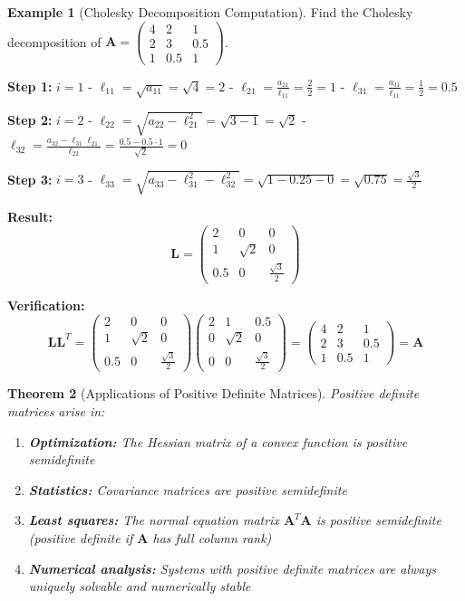 \documentclass[12pt]{article}
\numberwithin{equation}{section}
\newcommand{\mat}[1]{\mathbf{#1}}        %
\theoremstyle{plain}
\newtheorem{theorem}{Theorem}[section]
\theoremstyle{definition}
\newtheorem{example}[theorem]{Example}
\theoremstyle{remark}
\begin{document}
\begin{example}[Cholesky Decomposition Computation]
Find the Cholesky decomposition of $\mat{A} = \begin{pmatrix} 4 & 2 & 1 \\ 2 & 3 & 0.5 \\ 1 & 0.5 & 1 \end{pmatrix}$.

\textbf{Step 1:} $i = 1$
- $\ell_{11} = \sqrt{a_{11}} = \sqrt{4} = 2$
- $\ell_{21} = \frac{a_{21}}{\ell_{11}} = \frac{2}{2} = 1$
- $\ell_{31} = \frac{a_{31}}{\ell_{11}} = \frac{1}{2} = 0.5$

\textbf{Step 2:} $i = 2$
- $\ell_{22} = \sqrt{a_{22} - \ell_{21}^2} = \sqrt{3 - 1} = \sqrt{2}$
- $\ell_{32} = \frac{a_{32} - \ell_{31}\ell_{21}}{\ell_{22}} = \frac{0.5 - 0.5 \cdot 1}{\sqrt{2}} = 0$

\textbf{Step 3:} $i = 3$
- $\ell_{33} = \sqrt{a_{33} - \ell_{31}^2 - \ell_{32}^2} = \sqrt{1 - 0.25 - 0} = \sqrt{0.75} = \frac{\sqrt{3}}{2}$

\textbf{Result:}
$$\mat{L} = \begin{pmatrix} 2 & 0 & 0 \\ 1 & \sqrt{2} & 0 \\ 0.5 & 0 & \frac{\sqrt{3}}{2} \end{pmatrix}$$

\textbf{Verification:}
$$\mat{L}\mat{L}^T = \begin{pmatrix} 2 & 0 & 0 \\ 1 & \sqrt{2} & 0 \\ 0.5 & 0 & \frac{\sqrt{3}}{2} \end{pmatrix}\begin{pmatrix} 2 & 1 & 0.5 \\ 0 & \sqrt{2} & 0 \\ 0 & 0 & \frac{\sqrt{3}}{2} \end{pmatrix} = \begin{pmatrix} 4 & 2 & 1 \\ 2 & 3 & 0.5 \\ 1 & 0.5 & 1 \end{pmatrix} = \mat{A}$$ \checkmark
\end{example}

\begin{theorem}[Applications of Positive Definite Matrices]
Positive definite matrices arise in:
\begin{enumerate}
\item \textbf{Optimization:} The Hessian matrix of a convex function is positive semidefinite
\item \textbf{Statistics:} Covariance matrices are positive semidefinite
\item \textbf{Least squares:} The normal equation matrix $\mat{A}^T\mat{A}$ is positive semidefinite (positive definite if $\mat{A}$ has full column rank)
\item \textbf{Numerical analysis:} Systems with positive definite matrices are always uniquely solvable and numerically stable
\end{enumerate}
\end{theorem}
\end{document}
